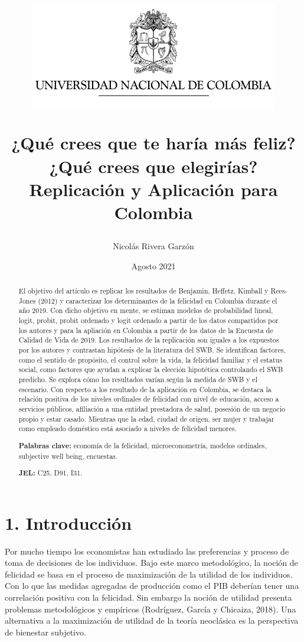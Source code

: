 \documentclass[12pt,spanish]{article}
\title{\begin{figure}[h!]
\centering
\includegraphics[scale=0.8]{logo-unal(1).png}
\end{figure}
\textbf{¿Qué crees que te haría más feliz? ¿Qué crees que elegirías? Replicación y Aplicación para Colombia}}
\author{Nicolás Rivera Garzón}
\date{Agosto 2021}
\begin{document}
\maketitle

\begin{abstract}
\justify
\noindent  El objetivo del artículo es replicar los resultados de Benjamin, Heffetz, Kimball y Rees-Jones (2012) y caracterizar los determinantes de la felicidad en Colombia durante el año 2019. Con dicho objetivo en mente, se estiman modelos de probabilidad lineal, logit, probit, probit ordenado y logit ordenado a partir de los datos compartidos por los autores y para la apliación en Colombia a partir de los datos de la Encuesta de Calidad de Vida de 2019. Los resultados de la replicación son iguales a los expuestos por los autores y contrastan hipótesis de la literatura del SWB. Se identifican factores, como el sentido de propósito, el control sobre la vida, la felicidad familiar y el estatus social, como factores que ayudan a explicar la elección hipotética controlando el SWB predicho. Se explora cómo los resultados varían según la medida de SWB y el escenario. Con respecto a los resultado de la aplicación en Colombia, se destaca la relación positiva de los niveles ordinales de felicidad con nivel de educación, acceso a servicios públicos, afiliación a una entidad prestadora de salud, posesión de un negocio propio y estar casado. Mientras que la edad, ciudad de origen, ser mujer y trabajar como empleado doméstico está asociado a niveles de felicidad menores.\\

\vspace{0.2cm}

\noindent \textbf{Palabras clave:} economía de la felicidad, microeconometría, modelos ordinales, subjective well being, encuestas.

\vspace{0.2cm}

\noindent \textbf{JEL:}  C25, D91, I31.
\end{abstract}

\newpage

\section*{1. Introducción}

Por mucho tiempo los economistas han estudiado las preferencias y proceso de toma de decisiones de los individuos. Bajo este marco metodológico, la noción de felicidad se basa en el proceso de maximización de la utilidad de los individuos. Con lo que las medidas agregadas de producción como el PIB deberían tener una correlación positiva con la felicidad. Sin embargo la noción de utilidad presenta problemas metodológicos y empíricos (Rodríguez, García y Chicaiza, 2018). Una alternativa a la maximización de utilidad de la teoría neoclásica es la perspectiva de bienestar subjetivo. 
\end{document}
